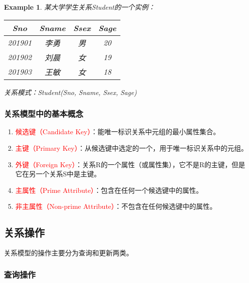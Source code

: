 \documentclass{../../note}
\newtheorem{example}{Example}
\begin{document}
\begin{example}
  某大学学生关系Student的一个实例：

  \begin{center}
    \begin{tabular}{|c|c|c|c|}
      \hline
      \textbf{Sno} & \textbf{Sname} & \textbf{Ssex} & \textbf{Sage} \\
      \hline
      201901 & 李勇 & 男 & 20 \\
      \hline
      201902 & 刘晨 & 女 & 19 \\
      \hline
      201903 & 王敏 & 女 & 18 \\
      \hline
    \end{tabular}
  \end{center}

  关系模式：Student(Sno, Sname, Ssex, Sage)
\end{example}

\subsubsection{关系模型中的基本概念}

\begin{enumerate}
  \item \textcolor{red}{候选键（Candidate Key）}：能唯一标识关系中元组的最小属性集合。
  \item \textcolor{red}{主键（Primary Key）}：从候选键中选定的一个，用于唯一标识关系中的元组。
  \item \textcolor{red}{外键（Foreign Key）}：关系R的一个属性（或属性集），它不是R的主键，但是它在另一个关系S中是主键。
  \item \textcolor{red}{主属性（Prime Attribute）}：包含在任何一个候选键中的属性。
  \item \textcolor{red}{非主属性（Non-prime Attribute）}：不包含在任何候选键中的属性。
\end{enumerate}

\subsection{关系操作}

关系模型的操作主要分为查询和更新两类。

\subsubsection{查询操作}
\end{document}

